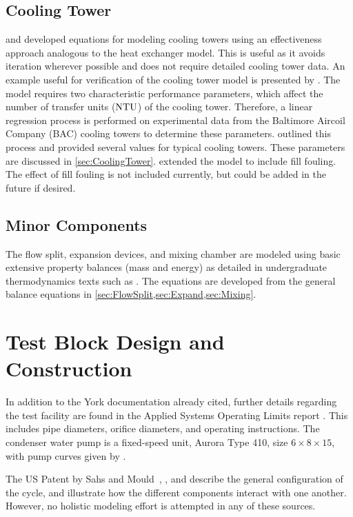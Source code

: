 \subsection{Cooling Tower}
\textcite{braun1989} and \textcite{mitchell2013} developed equations for modeling cooling towers 
using an effectiveness approach analogous to the heat exchanger model.
This is useful as it avoids iteration wherever possible
and does not require detailed cooling tower data. 
An example useful for verification of the cooling tower model 
is presented by \textcite{mitchell2013}. 
The model requires two characteristic performance parameters, 
which affect the number of transfer units ($\mathrm{NTU}$) of the cooling tower.
Therefore, a linear regression process is performed on experimental data from 
the Baltimore Aircoil Company 
(BAC) cooling towers \parencite{CLTselect} 
to determine these parameters.
\textcite{braun1989} outlined this process and provided several values 
for typical cooling towers. 
These parameters are discussed in \cref{sec:CoolingTower}.
\textcite{qureshi2006} extended the model to include fill fouling.
The effect of fill fouling is not included currently, but could be added 
in the future if desired.

\subsection{Minor Components}
The flow split, expansion devices, and mixing chamber are modeled using 
basic extensive property balances (mass and energy) as detailed in 
undergraduate thermodynamics texts such as \textcite{cengel2011}. 
The equations are developed from the general balance equations 
in \cref{sec:FlowSplit,sec:Expand,sec:Mixing}.

\section{Test Block Design and Construction}
In addition to the York documentation already cited, further details
regarding the test facility are found in the Applied Systems Operating Limits
report \parencite{bluebook}. This includes pipe diameters, orifice diameters, and
operating instructions. The condenser water pump is a fixed-speed unit,
Aurora Type 410, size $6\times8\times15$, with pump curves given by
\textcite{aurora2007}.

The US Patent by Sahs and Mould~\parencite{sahs1956}, \textcite{dirlea1996},
and \textcite{mcgovern1984} describe the general configuration
of the cycle, and illustrate how the different components interact with one 
another.
However, no holistic modeling effort is attempted in any of these sources.

